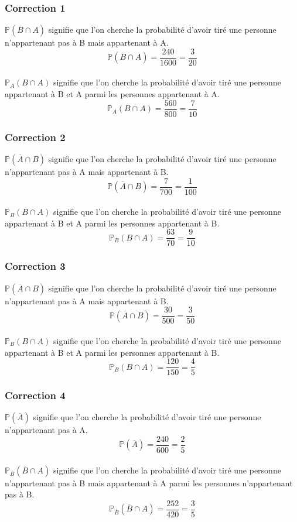 \documentclass[15pt, mathserif]{beamer}
\begin{document}
\begin{frame}
\vspace{-10mm}
	\frametitle{Correction 1}

 $\mathbb{P}(\overline{B} \cap A)$ signifie que l'on cherche la probabilité d'avoir tiré une personne n'appartenant pas à B mais appartenant à A. $$\mathbb{P}(\overline{B} \cap A)=\dfrac{240}{1600 }= \dfrac{3}{20}$$
 \\ $\mathbb{P}_{A} (B \cap A)$ signifie que l'on cherche la probabilité d'avoir tiré une personne appartenant à B et A parmi les personnes appartenant à A. $$\mathbb{P}_{A} (B \cap A)=\dfrac{560}{800 }= \dfrac{7}{10}$$ 
 
\end{frame}


\begin{frame}
\vspace{-10mm}
	\frametitle{Correction 2}

 $\mathbb{P}(\overline{A} \cap B)$ signifie que l'on cherche la probabilité d'avoir tiré une personne  n'appartenant pas à A mais appartenant à B. $$\mathbb{P}(\overline{A} \cap B)=\dfrac{7}{700 }= \dfrac{1}{100}$$
 \\ $\mathbb{P}_{B} (B \cap A)$ signifie que l'on cherche la probabilité d'avoir tiré une personne appartenant à B et A parmi les personnes appartenant à B. $$\mathbb{P}_{B} (B \cap A) =\dfrac{63}{70 }= \dfrac{9}{10}$$
\end{frame}


\begin{frame}
\vspace{-10mm}
	\frametitle{Correction 3}

 $\mathbb{P}(\overline{A} \cap B)$ signifie que l'on cherche la probabilité d'avoir tiré une personne  n'appartenant pas à A mais appartenant à B. $$\mathbb{P}(\overline{A} \cap B)=\dfrac{30}{500 }= \dfrac{3}{50}$$
 \\ $\mathbb{P}_{B} (B \cap A)$ signifie que l'on cherche la probabilité d'avoir tiré une personne appartenant à B et A parmi les personnes appartenant à B. $$\mathbb{P}_{B} (B \cap A) =\dfrac{120}{150 }= \dfrac{4}{5}$$
\end{frame}


\begin{frame}
\vspace{-10mm}
	\frametitle{Correction 4}

 $\mathbb{P}(\overline{A})$ signifie que l'on cherche la probabilité d'avoir tiré une personne n'appartenant pas à A.  $$\mathbb{P}(\overline{A})=\dfrac{240}{600 }= \dfrac{2}{5}$$
 \\ $\mathbb{P}_{\overline{B}} (\overline{B} \cap A)$ signifie que l'on cherche la probabilité d'avoir tiré une personne n'appartenant pas à B mais appartenant à A parmi les personnes n'appartenant pas à B. $$\mathbb{P}_{\overline{B}} (\overline{B} \cap A)=\dfrac{252}{420 }= \dfrac{3}{5}$$
\end{frame}
\end{document}
